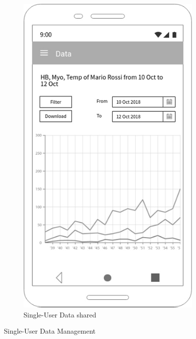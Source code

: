\begin{figure}[h!]
\begin{subfigure}[b]{0.25\linewidth}
  \end{subfigure}
 ~ ~ ~ ~ ~ ~ 
  \begin{subfigure}[b]{0.25\linewidth}

    \includegraphics[width=\linewidth]{img/mockup/tp_data.jpg}

    \caption{Single-User Data shared}

  \end{subfigure}

  \caption{Single-User Data  Management}

 \end{figure}

